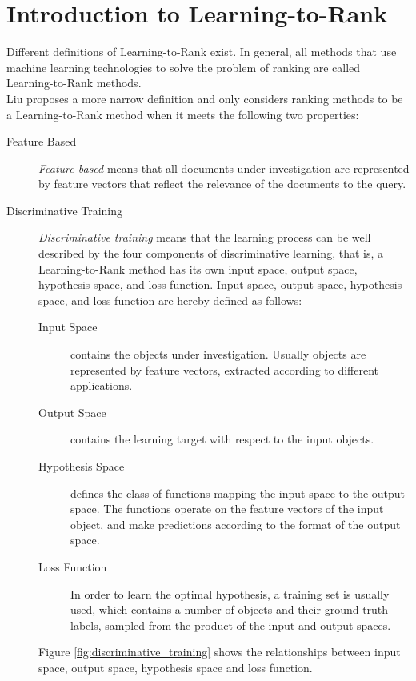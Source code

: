 \chapter{Introduction to Learning-to-Rank}
Different definitions of Learning-to-Rank exist. In general, all methods that use machine learning technologies to solve the problem of ranking are called Learning-to-Rank methods.\\
Liu \cite{Liu2007} proposes a more narrow definition and only considers ranking methods to be a Learning-to-Rank method when it meets the following two properties:
\begin{description}
\item[Feature Based]{\emph{Feature based} means that all documents under investigation are represented by feature vectors that reflect the relevance of the documents to the query.}
\item[Discriminative Training]{\emph{Discriminative training} means that the learning process can be well described by the four components of discriminative learning, that is, a Learning-to-Rank method has its own input space, output space, hypothesis space, and loss function. Input space, output space, hypothesis space, and loss function are hereby defined as follows:
	\begin{description}
	\item[Input Space]{contains the objects under investigation. Usually objects are represented by feature vectors, extracted according to different applications.}
	\item[Output Space]{contains the learning target with respect to the input objects.}
	\item[Hypothesis Space]{defines the class of functions mapping the input space to the output space. The functions operate on the feature vectors of the input object, and make predictions according to the format of the output space.}
	\item[Loss Function]{In order to learn the optimal hypothesis, a training set is usually used, which contains a number of objects and their ground truth labels, sampled from the product of the input and output spaces.}
	\end{description}
Figure \ref{fig:discriminative_training} shows the relationships between input space, output space, hypothesis space and loss function.
}


\end{description}
